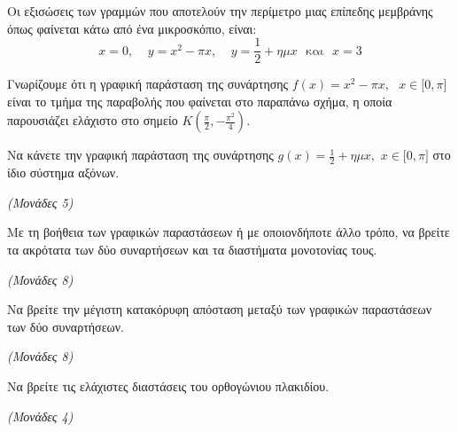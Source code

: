 \documentclass[11pt,a4paper,twoside]{book}
\newcommand{\monades}[1]{\hfill \textit{(Μονάδες #1)}}
\begin{document}
Οι εξισώσεις των γραμμών που αποτελούν την περίμετρο μιας επίπεδης μεμβράνης όπως φαίνεται κάτω από ένα μικροσκόπιο, είναι:
\begin{equation*}x = 0,\ \ \ \ \ y = x^{2} - \pi x,\ \ \ \ \ y = \frac{1}{2} + \eta\mu x\ \ \ \text{και}\ \ \ x = 3\end{equation*}

\begin{center}
\end{center}

\begin{alist}
\item Γνωρίζουμε ότι η γραφική παράσταση της συνάρτησης $f(x) = x^{2} - \pi x,\text{   }x \in \lbrack 0,\pi\rbrack$ είναι το τμήμα της παραβολής που φαίνεται στο παραπάνω σχήμα, η οποία παρουσιάζει ελάχιστο στο σημείο $Κ\left( \frac{\pi}{2}, - \frac{\pi^{2}}{4} \right)$.

Να κάνετε την γραφική παράσταση της συνάρτησης $g(x) = \frac{1}{2} + \eta\mu x,$ $x \in \lbrack 0,\pi\rbrack$ στο ίδιο σύστημα αξόνων.

\monades{5}

\item Με τη βοήθεια των γραφικών παραστάσεων ή με οποιονδήποτε άλλο τρόπο, να βρείτε τα ακρότατα των δύο συναρτήσεων και τα διαστήματα μονοτονίας τους.

\monades{8}

\item Να βρείτε την μέγιστη κατακόρυφη απόσταση μεταξύ των γραφικών παραστάσεων των δύο συναρτήσεων.

\monades{8}

\item Να βρείτε τις ελάχιστες διαστάσεις του ορθογώνιου πλακιδίου.

\monades{4}
\end{alist}
\end{document}
